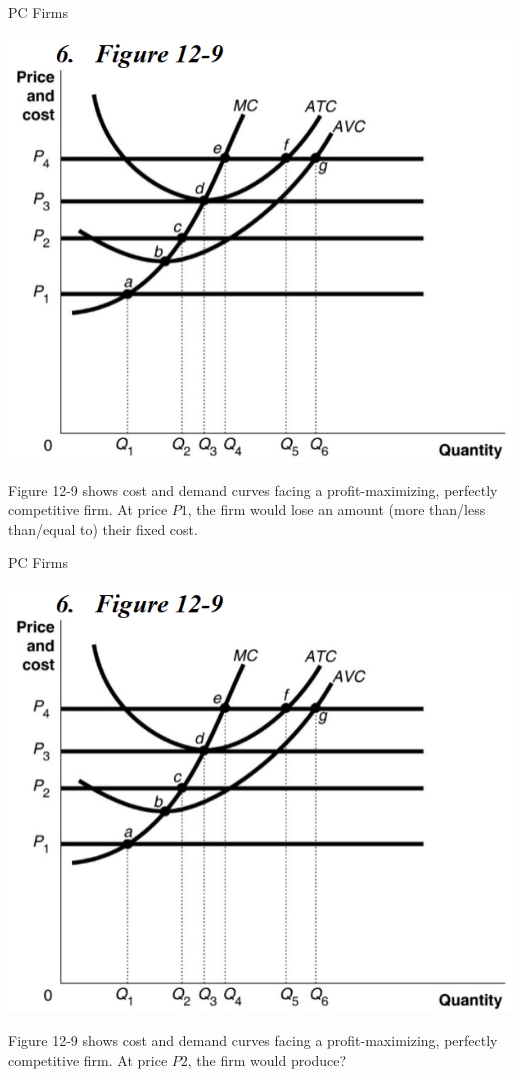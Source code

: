 \documentclass{beamer}
\begin{document}
\begin{frame}[t]{PC Firms}
    \begin{center}
        \includegraphics[scale=.6]{images/graph.png}
    \end{center}
    \newline
    Figure 12-9 shows cost and demand curves facing a profit-maximizing, perfectly competitive firm. At price $P1$, the firm would lose an amount (more than/less than/equal to) their fixed cost.
\end{frame}

\begin{frame}[t]{PC Firms}
    \begin{center}
        \includegraphics[scale=.6]{images/graph.png}
    \end{center}
    \newline
    Figure 12-9 shows cost and demand curves facing a profit-maximizing, perfectly competitive firm. At price $P2$, the firm would produce?
\end{frame}
\end{document}
